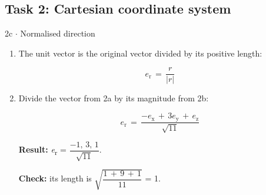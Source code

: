 \documentclass[11pt]{article}
\begin{document}
\begin{keepsection}\subsection{Task 2: Cartesian coordinate system}

\begin{workedbox}{2c \ensuremath{\cdot} Normalised direction}
\begin{enumerate}
\item {}
The unit vector is the original vector divided by its positive length:

\begin{equation*}{e}_{\mathrm{r}}\, =\, \dfrac{{r}}{|{r}|}\end{equation*}
\item {}
Divide the vector from 2a by its magnitude from 2b:

\begin{equation*}{e}_{\mathrm{r}}\, =\, \dfrac{-{e}_{\mathrm{x}}\, +\, 3{e}_{\mathrm{y}}\, +\, {e}_{\mathrm{z}}}{\sqrt{11}}\end{equation*}

\textbf{Result:} \textit{e}\textsubscript{r} = {\small\ensuremath{\dfrac{-1,\, 3,\, 1}{\sqrt{11}}}}.

\textbf{Check:} its length is \ensuremath{\sqrt{\dfrac{1\, +\, 9\, +\, 1}{11}}} = 1.
\end{enumerate}
\end{workedbox}

\end{keepsection}
\end{document}
